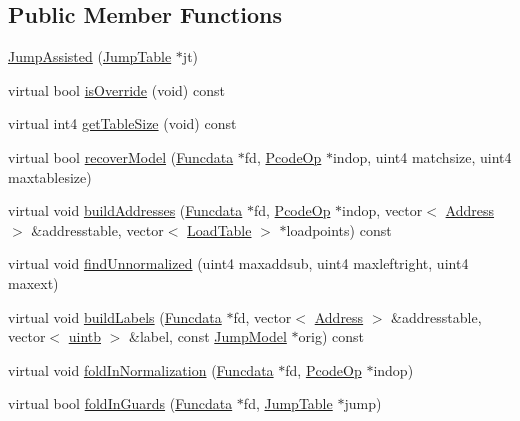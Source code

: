 \subsection*{Public Member Functions}
\begin{DoxyCompactItemize}
\item 
\mbox{\hyperlink{class_jump_assisted_aa8168c811826d1a3a55c505a7eefbc7d}{Jump\+Assisted}} (\mbox{\hyperlink{class_jump_table}{Jump\+Table}} $\ast$jt)
\item 
virtual bool \mbox{\hyperlink{class_jump_assisted_a1169f3856b15ba64fb229deec899a49b}{is\+Override}} (void) const
\item 
virtual int4 \mbox{\hyperlink{class_jump_assisted_a4d6285c9afd737070fe335b86d7592fa}{get\+Table\+Size}} (void) const
\item 
virtual bool \mbox{\hyperlink{class_jump_assisted_a54a3d21e91b75d420340cd403a53fc63}{recover\+Model}} (\mbox{\hyperlink{class_funcdata}{Funcdata}} $\ast$fd, \mbox{\hyperlink{class_pcode_op}{Pcode\+Op}} $\ast$indop, uint4 matchsize, uint4 maxtablesize)
\item 
virtual void \mbox{\hyperlink{class_jump_assisted_aff52f4a983f867d9bd105a6856e473a5}{build\+Addresses}} (\mbox{\hyperlink{class_funcdata}{Funcdata}} $\ast$fd, \mbox{\hyperlink{class_pcode_op}{Pcode\+Op}} $\ast$indop, vector$<$ \mbox{\hyperlink{class_address}{Address}} $>$ \&addresstable, vector$<$ \mbox{\hyperlink{class_load_table}{Load\+Table}} $>$ $\ast$loadpoints) const
\item 
virtual void \mbox{\hyperlink{class_jump_assisted_a76bb3f116ab239f3b3f3fcf0410028d7}{find\+Unnormalized}} (uint4 maxaddsub, uint4 maxleftright, uint4 maxext)
\item 
virtual void \mbox{\hyperlink{class_jump_assisted_aa8d0c353dd73697469c552b04146efe6}{build\+Labels}} (\mbox{\hyperlink{class_funcdata}{Funcdata}} $\ast$fd, vector$<$ \mbox{\hyperlink{class_address}{Address}} $>$ \&addresstable, vector$<$ \mbox{\hyperlink{types_8h_a2db313c5d32a12b01d26ac9b3bca178f}{uintb}} $>$ \&label, const \mbox{\hyperlink{class_jump_model}{Jump\+Model}} $\ast$orig) const
\item 
virtual void \mbox{\hyperlink{class_jump_assisted_aa9732767f921501368f90bd0d1defa1a}{fold\+In\+Normalization}} (\mbox{\hyperlink{class_funcdata}{Funcdata}} $\ast$fd, \mbox{\hyperlink{class_pcode_op}{Pcode\+Op}} $\ast$indop)
\item 
virtual bool \mbox{\hyperlink{class_jump_assisted_a9162ab4e23d4d31e7b16e46a42442a98}{fold\+In\+Guards}} (\mbox{\hyperlink{class_funcdata}{Funcdata}} $\ast$fd, \mbox{\hyperlink{class_jump_table}{Jump\+Table}} $\ast$jump)

\end{DoxyCompactItemize}
